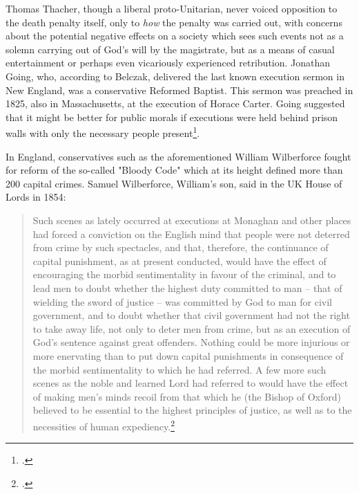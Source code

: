 Thomas Thacher, though a liberal proto-Unitarian, never voiced opposition to the death penalty itself, only to \textit{how} the penalty was carried out, with concerns about the potential negative effects on a society which sees such events not as a solemn carrying out of God's will by the magistrate, but as a means of casual entertainment or perhaps even vicariously experienced retribution.  Jonathan Going, who, according to Belczak, delivered the last known execution sermon in New England, was a conservative Reformed Baptist.  This sermon was preached in 1825, also in Massachusetts, at the execution of Horace Carter.  Going suggested that it might be better for public morals if executions were held behind prison walls with only the necessary people present\footcite[This is largely my position.  The death penalty should be carried out.  Victim families, law enforcement, members of the press should be able to attend. Nothing should be transmitted live, because anything transmitted live can be recorded and replayed.  No video or audio should be taken.  Nothing that could give any kind of relevance or martyrdom to the condemned prisoner should be allowed.]{belczakchanging}.

In England, conservatives such as the aforementioned William Wilberforce fought for reform of the so-called "Bloody Code" which at its height defined more than 200 capital crimes.  Samuel Wilberforce, William's son, said in the UK House of Lords in 1854:
\begin{quote}
Such scenes as lately occurred at executions at Monaghan and other places had forced a conviction on the English mind that people were not deterred from crime by such spectacles, and that, therefore, the continuance of capital punishment, as at present conducted, would have the effect of encouraging the morbid sentimentality in favour of the criminal, and to lead men to doubt whether the highest duty committed to man -- that of wielding the sword of justice -- was committed by God to man for civil government, and to doubt whether that civil government had not the right to take away life, not only to deter men from crime, but as an execution of God's sentence against great offenders. Nothing could be more injurious or more enervating than to put down capital punishments in consequence of the morbid sentimentality to which he had referred. A few more such scenes as the noble and learned Lord had referred to would have the effect of making men's minds recoil from that which he (the Bishop of Oxford) believed to be essential to the highest principles of justice, as well as to the necessities of human expediency.\footcite{wilberforcecapitalexecutions}
\end{quote}

